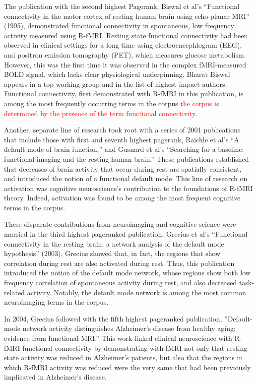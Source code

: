 \documentclass[5p]{elsarticle}
\begin{document}
The publication with the second highest Pagerank, Biswal et al’s ``Functional
connectivity in the motor cortex of resting human brain using echo-planar MRI''
(1995)\cite{Biswal1995}, demonstrated functional connectivity in spontaneous,
low frequency activity measured using R-fMRI. Resting state functional
connectivity had been observed in clinical settings for a long time using
electroencephlogram (EEG), and positron emission tomography (PET), which
measures glucose metabolism. However, this was the first time it was observed in
the complex fMRI-measured BOLD signal, which lacks clear physiological
underpinning. Bharat Biswal appears in a top working group and in the list of
highest impact authors. Functional connectivity, first demonstrated with R-fMRI
in this publication, is among the most frequently occurring terms in the corpus
\textcolor{red}{the corpus is determined by the presence of the term functional
connectivity}. 

Another, separate line of research took root with a series of 2001 publications
that include those with first and seventh highest pagerank, Raichle et al’s ``A
default mode of brain function,'' and Gusnard et al’s ``Searching for a baseline:
functional imaging and the resting human brain.'' These publications established
that decreases of brain activity that occur during rest are spatially
consistent, and introduced the notion of a functional default mode. This line of
research on activation was cognitive neuroscience’s contribution to the
foundations of R-fMRI theory. Indeed, activation was found to be among the most
frequent cognitive terms in the corpus.

These disparate contributions from neuroimaging and cognitive science were
married in the third highest pageranked publication, Grecius et al’s ``Functional
connectivity in the resting brain: a network analysis of the default mode
hypothesis'' (2003). Grecius showed that, in fact, the regions that show
correlation during rest are also activated during rest. Thus, this publication
introduced the notion of the default mode network, whose regions show both low
frequency correlation of spontaneous activity during rest, and also decreased
task-related activity. Notably, the default mode network is among the most
common neuroimaging terms in the corpus.

In 2004, Grecius followed with the fifth highest pageranked publication,
''Default-mode network activity distinguishes Alzheimer’s disease from healthy
aging: evidence from functional MRI.'' This work linked clinical neuroscience
with R-fMRI functional connectivity by demonstrating with fMRI not only that
resting state activity was reduced in Alzheimer’s patients, but also that the
regions in which R-fMRI activity was reduced were the very same that had been
previously implicated in Alzheimer’s disease. 
\end{document}
